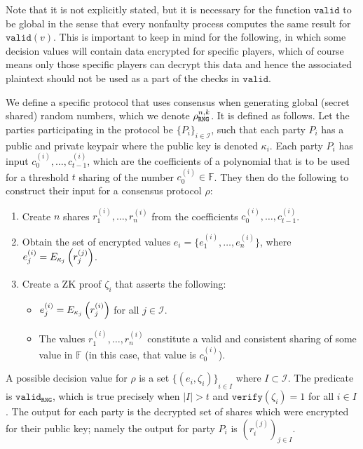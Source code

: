 \documentclass{article}
\theoremstyle{remark}
\newcommand{\F}{\mathbb{F}}
\begin{document}
Note that it is not explicitly stated, but it is necessary for the function
$\texttt{valid}$ to be global in the sense that every nonfaulty process
computes the same result for $\texttt{valid}(v)$. This is important to keep in
mind for the following, in which some decision values will contain data
encrypted for specific players, which of course means only those specific
players can decrypt this data and hence the associated plaintext should not be
used as a part of the checks in $\texttt{valid}$.

We define a specific protocol that uses consensus when generating global
(secret shared) random numbers, which we denote $\rho_\texttt{RNG}^{n, k}$. It is defined
as follows. Let the parties participating in the protocol be ${\{P_i\}}_{i \in
\mathcal{I}}$, such that each party $P_i$ has a public and private keypair
where the public key is denoted $\kappa_i$. Each party $P_i$ has input
$c_0^{(i)}, \ldots, c_{t-1}^{(i)}$, which are the coefficients of a polynomial
that is to be used for a threshold $t$ sharing of the number $c_0^{(i)} \in
\F$. They then do the following to construct their input for a consensus
protocol $\rho$:

\begin{enumerate}
	\item Create $n$ shares $r_1^{(i)}, \ldots, r_n^{(i)}$ from the
		coefficients $c_0^{(i)}, \ldots, c_{t-1}^{(i)}$.
	\item Obtain the set of encrypted values $e_i = \{e_1^{(i)},
		\ldots, e_n^{(i)}\}$, where $e_j^{(i)} =
		E_{\kappa_j}\left(r_j^{(j)}\right)$.
	\item Create a ZK proof $\zeta_i$ that asserts the following:
		\begin{itemize}
			\item $e_j^{(i)} = E_{\kappa_j}\left(r_j^{(i)}\right)$ for all
				$j \in \mathcal{I}$.
			\item The values $r_1^{(i)}, \ldots, r_n^{(i)}$ constitute
				a valid and consistent sharing of some value in $\F$ (in this
				case, that value is $c_0^{(i)}$).
		\end{itemize}
\end{enumerate}

A possible decision value for $\rho$ is a set ${\{(e_i, \zeta_i)\}}_{i \in I}$
where $I \subset \mathcal{I}$. The predicate is $\texttt{valid}_\texttt{RNG}$,
which is true precisely when $|I| > t$ and $\texttt{verify}(\zeta_i) = 1$ for
all $i \in I$. The output for each party is the decrypted set of shares which
were encrypted for their public key; namely the output for party $P_i$ is
${(r_i^{(j)})}_{j \in I}$.
\end{document}
